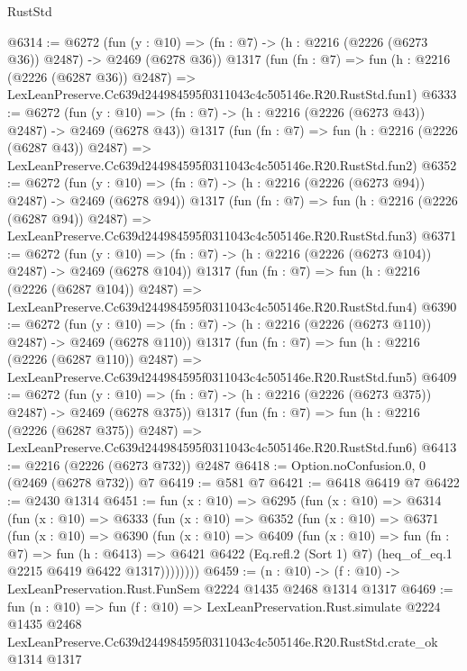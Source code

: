 \begin{lexlean}{RustStd}
\begin{coremodule}
@6314 := @6272
    (fun (y : @10) => (fn : @7) -> (h : @2216 (@2226 (@6273 @36)) @2487) -> @2469 (@6278 @36))
    @1317
    (fun (fn : @7) =>
    fun (h : @2216 (@2226 (@6287 @36)) @2487) =>
    LexLeanPreserve.Cc639d244984595f0311043c4c505146e.R20.RustStd.fun1)
@6333 := @6272
    (fun (y : @10) => (fn : @7) -> (h : @2216 (@2226 (@6273 @43)) @2487) -> @2469 (@6278 @43))
    @1317
    (fun (fn : @7) =>
    fun (h : @2216 (@2226 (@6287 @43)) @2487) =>
    LexLeanPreserve.Cc639d244984595f0311043c4c505146e.R20.RustStd.fun2)
@6352 := @6272
    (fun (y : @10) => (fn : @7) -> (h : @2216 (@2226 (@6273 @94)) @2487) -> @2469 (@6278 @94))
    @1317
    (fun (fn : @7) =>
    fun (h : @2216 (@2226 (@6287 @94)) @2487) =>
    LexLeanPreserve.Cc639d244984595f0311043c4c505146e.R20.RustStd.fun3)
@6371 := @6272
    (fun (y : @10) => (fn : @7) -> (h : @2216 (@2226 (@6273 @104)) @2487) -> @2469 (@6278 @104))
    @1317
    (fun (fn : @7) =>
    fun (h : @2216 (@2226 (@6287 @104)) @2487) =>
    LexLeanPreserve.Cc639d244984595f0311043c4c505146e.R20.RustStd.fun4)
@6390 := @6272
    (fun (y : @10) => (fn : @7) -> (h : @2216 (@2226 (@6273 @110)) @2487) -> @2469 (@6278 @110))
    @1317
    (fun (fn : @7) =>
    fun (h : @2216 (@2226 (@6287 @110)) @2487) =>
    LexLeanPreserve.Cc639d244984595f0311043c4c505146e.R20.RustStd.fun5)
@6409 := @6272
    (fun (y : @10) => (fn : @7) -> (h : @2216 (@2226 (@6273 @375)) @2487) -> @2469 (@6278 @375))
    @1317
    (fun (fn : @7) =>
    fun (h : @2216 (@2226 (@6287 @375)) @2487) =>
    LexLeanPreserve.Cc639d244984595f0311043c4c505146e.R20.RustStd.fun6)
@6413 := @2216 (@2226 (@6273 @732)) @2487
@6418 := Option.noConfusion.{0, 0} (@2469 (@6278 @732)) @7
@6419 := @581 @7
@6421 := @6418 @6419 @7
@6422 := @2430 @1314
@6451 := fun (x : @10) =>
  @6295
    (fun (x : @10) =>
    @6314
      (fun (x : @10) =>
      @6333
        (fun (x : @10) =>
        @6352
          (fun (x : @10) =>
          @6371
            (fun (x : @10) =>
            @6390
              (fun (x : @10) =>
              @6409
                (fun (x : @10) =>
                fun (fn : @7) =>
                fun (h : @6413) =>
                @6421 @6422 (Eq.refl.{2} (Sort 1) @7) (heq_of_eq.{1} @2215 @6419 @6422 @1317))))))))
@6459 := (n : @10) -> (f : @10) -> LexLeanPreservation.Rust.FunSem @2224 @1435 @2468 @1314 @1317
@6469 := fun (n : @10) =>
  fun (f : @10) =>
  LexLeanPreservation.Rust.simulate
    @2224
    @1435
    @2468
    LexLeanPreserve.Cc639d244984595f0311043c4c505146e.R20.RustStd.crate_ok
    @1314
    @1317
\end{coremodule}
\end{lexlean}
